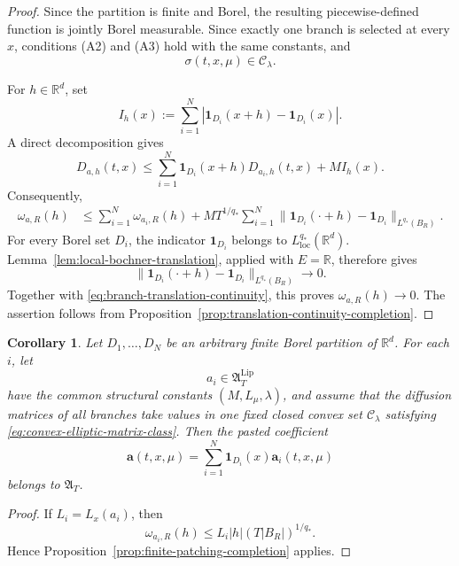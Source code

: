 \documentclass[12pt,oneside, reqno]{amsart}
\newtheorem{corollary}[theorem]{Corollary}
\numberwithin{equation}{section}
\begin{document}
	\begin{proof}
		Since the partition is finite and Borel, the resulting piecewise-defined
		function is jointly Borel measurable.  Since exactly one
		branch is selected at every \(x\), conditions \textnormal{(A2)} and
		\textnormal{(A3)} hold with the same constants, and
		\[
		\sigma(t,x,\mu)\in\mathcal C_\lambda.
		\]
		
		For \(h\in\mathbb R^d\), set
		\[
		I_h(x)
		:=
		\sum_{i=1}^N
		|\mathbf1_{D_i}(x+h)-\mathbf1_{D_i}(x)|.
		\]
		A direct decomposition gives
		\begin{equation}
			\label{eq:finite-patching-translation-bound}
			D_{a,h}(t,x)
			\leq
			\sum_{i=1}^N
			\mathbf1_{D_i}(x+h)D_{a_i,h}(t,x)
			+
			M I_h(x).
		\end{equation}
		Consequently,
		\begin{align}
			\omega_{a,R}(h)
			&\leq
			\sum_{i=1}^N\omega_{a_i,R}(h)
			+
			MT^{1/q_\ast}
			\sum_{i=1}^N
			\|\mathbf1_{D_i}(\cdot+h)-\mathbf1_{D_i}\|_{L^{q_\ast}(B_R)}.
			\label{eq:finite-patching-modulus}
		\end{align}
		For every Borel set \(D_i\), the indicator
		\(\mathbf1_{D_i}\) belongs to \(L^{q_\ast}_{\mathrm{loc}}(\mathbb R^d)\).
		Lemma~\ref{lem:local-bochner-translation}, applied with \(E=\mathbb R\),
		therefore gives
		\[
		\|\mathbf1_{D_i}(\cdot+h)-\mathbf1_{D_i}\|_{L^{q_\ast}(B_R)}
		\longrightarrow0.
		\]
		Together with \eqref{eq:branch-translation-continuity}, this proves
		\(\omega_{a,R}(h)\to0\). The assertion follows from
		Proposition~\ref{prop:translation-continuity-completion}.
	\end{proof}
	
	\begin{corollary}
		\label{cor:piecewise-lipschitz-completion}
		Let \(D_1,\ldots,D_N\) be an arbitrary finite Borel partition of
		\(\mathbb R^d\). For each \(i\), let
		\[
		a_i\in\mathfrak A_T^{\mathrm{Lip}}
		\]
		have the common structural constants \((M,L_\mu,\lambda)\), and assume
		that the diffusion matrices of all branches take values in one fixed closed
		convex set \(\mathcal C_\lambda\) satisfying
		\eqref{eq:convex-elliptic-matrix-class}. Then the pasted coefficient
		\[
		\mathbf a(t,x,\mu)
		=
		\sum_{i=1}^N
		\mathbf1_{D_i}(x)\mathbf a_i(t,x,\mu)
		\]
		belongs to \(\mathfrak A_T\).
	\end{corollary}
	
	\begin{proof}
		If \(L_i=L_x(a_i)\), then
		\[
		\omega_{a_i,R}(h)
		\leq
		L_i|h|(T|B_R|)^{1/q_\ast}.
		\]
		Hence Proposition~\ref{prop:finite-patching-completion} applies.
	\end{proof}
	
\end{document}
